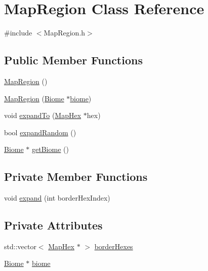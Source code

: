 \hypertarget{class_map_region}{}\section{Map\+Region Class Reference}
\label{class_map_region}


{\ttfamily \#include $<$Map\+Region.\+h$>$}

\subsection*{Public Member Functions}
\begin{DoxyCompactItemize}
\item 
\hyperlink{class_map_region_afa7078c0adce53bf31c78672cb20e19c}{Map\+Region} ()
\item 
\hyperlink{class_map_region_a4c83b6de01e0d376629224f121cbb160}{Map\+Region} (\hyperlink{class_biome}{Biome} $\ast$\hyperlink{class_map_region_a37c70c69760d6692ae47c91d0c4c261a}{biome})
\item 
void \hyperlink{class_map_region_a994b543b8092209f51661e78c58b27cc}{expand\+To} (\hyperlink{class_map_hex}{Map\+Hex} $\ast$hex)
\item 
bool \hyperlink{class_map_region_a83c761624f0d1d39751c8b2308b3abe3}{expand\+Random} ()
\item 
\hyperlink{class_biome}{Biome} $\ast$ \hyperlink{class_map_region_a6c7899cd97d9ed37b241dbd1cfde8970}{get\+Biome} ()
\end{DoxyCompactItemize}
\subsection*{Private Member Functions}
\begin{DoxyCompactItemize}
\item 
void \hyperlink{class_map_region_a25c75949874913978d51684c6d74c268}{expand} (int border\+Hex\+Index)
\end{DoxyCompactItemize}
\subsection*{Private Attributes}
\begin{DoxyCompactItemize}
\item 
std\+::vector$<$ \hyperlink{class_map_hex}{Map\+Hex} $\ast$ $>$ \hyperlink{class_map_region_a44514f0c27327dd183d8cdadfbf8eb2b}{border\+Hexes}
\item 
\hyperlink{class_biome}{Biome} $\ast$ \hyperlink{class_map_region_a37c70c69760d6692ae47c91d0c4c261a}{biome}
\end{DoxyCompactItemize}


